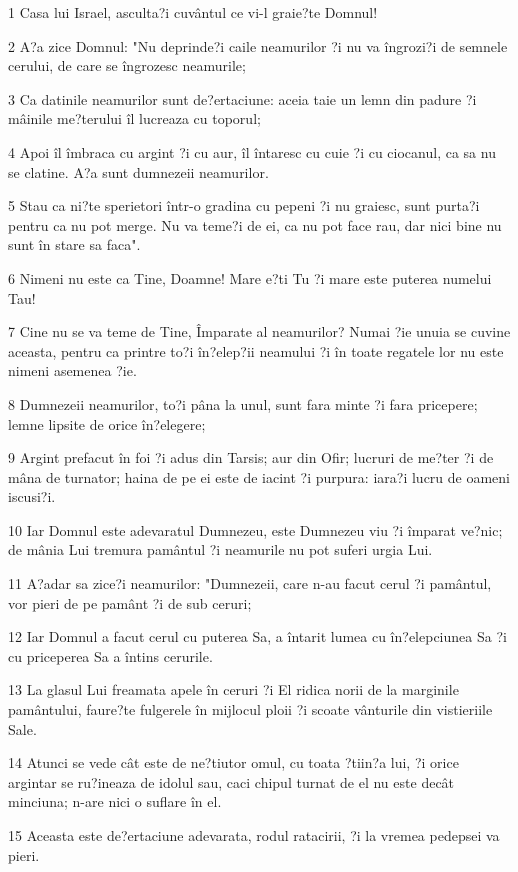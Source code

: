 \par 1 Casa lui Israel, asculta?i cuvântul ce vi-l graie?te Domnul!
\par 2 A?a zice Domnul: "Nu deprinde?i caile neamurilor ?i nu va îngrozi?i de semnele cerului, de care se îngrozesc neamurile;
\par 3 Ca datinile neamurilor sunt de?ertaciune: aceia taie un lemn din padure ?i mâinile me?terului îl lucreaza cu toporul;
\par 4 Apoi îl îmbraca cu argint ?i cu aur, îl întaresc cu cuie ?i cu ciocanul, ca sa nu se clatine. A?a sunt dumnezeii neamurilor.
\par 5 Stau ca ni?te sperietori într-o gradina cu pepeni ?i nu graiesc, sunt purta?i pentru ca nu pot merge. Nu va teme?i de ei, ca nu pot face rau, dar nici bine nu sunt în stare sa faca".
\par 6 Nimeni nu este ca Tine, Doamne! Mare e?ti Tu ?i mare este puterea numelui Tau!
\par 7 Cine nu se va teme de Tine, Împarate al neamurilor? Numai ?ie unuia se cuvine aceasta, pentru ca printre to?i în?elep?ii neamului ?i în toate regatele lor nu este nimeni asemenea ?ie.
\par 8 Dumnezeii neamurilor, to?i pâna la unul, sunt fara minte ?i fara pricepere; lemne lipsite de orice în?elegere;
\par 9 Argint prefacut în foi ?i adus din Tarsis; aur din Ofir; lucruri de me?ter ?i de mâna de turnator; haina de pe ei este de iacint ?i purpura: iara?i lucru de oameni iscusi?i.
\par 10 Iar Domnul este adevaratul Dumnezeu, este Dumnezeu viu ?i împarat ve?nic; de mânia Lui tremura pamântul ?i neamurile nu pot suferi urgia Lui.
\par 11 A?adar sa zice?i neamurilor: "Dumnezeii, care n-au facut cerul ?i pamântul, vor pieri de pe pamânt ?i de sub ceruri;
\par 12 Iar Domnul a facut cerul cu puterea Sa, a întarit lumea cu în?elepciunea Sa ?i cu priceperea Sa a întins cerurile.
\par 13 La glasul Lui freamata apele în ceruri ?i El ridica norii de la marginile pamântului, faure?te fulgerele în mijlocul ploii ?i scoate vânturile din vistieriile Sale.
\par 14 Atunci se vede cât este de ne?tiutor omul, cu toata ?tiin?a lui, ?i orice argintar se ru?ineaza de idolul sau, caci chipul turnat de el nu este decât minciuna; n-are nici o suflare în el.
\par 15 Aceasta este de?ertaciune adevarata, rodul ratacirii, ?i la vremea pedepsei va pieri.
